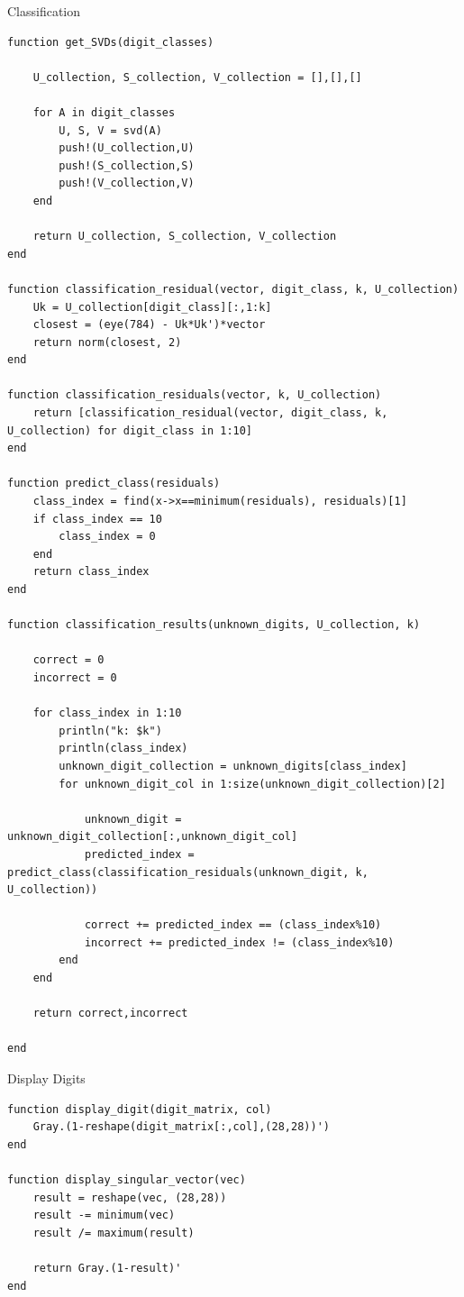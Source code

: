 \documentclass[a4paper]{article}
\begin{document}
\begin{algorithm}
\caption{Classification}

\begin{lstlisting}
function get_SVDs(digit_classes)

    U_collection, S_collection, V_collection = [],[],[]

    for A in digit_classes
        U, S, V = svd(A)
        push!(U_collection,U)
        push!(S_collection,S)
        push!(V_collection,V)
    end

    return U_collection, S_collection, V_collection
end

function classification_residual(vector, digit_class, k, U_collection)
    Uk = U_collection[digit_class][:,1:k]
    closest = (eye(784) - Uk*Uk')*vector
    return norm(closest, 2)
end

function classification_residuals(vector, k, U_collection)
    return [classification_residual(vector, digit_class, k, U_collection) for digit_class in 1:10]
end

function predict_class(residuals)
    class_index = find(x->x==minimum(residuals), residuals)[1]
    if class_index == 10
        class_index = 0
    end
    return class_index
end

function classification_results(unknown_digits, U_collection, k)
    
    correct = 0
    incorrect = 0

    for class_index in 1:10
        println("k: $k")
        println(class_index)
        unknown_digit_collection = unknown_digits[class_index]
        for unknown_digit_col in 1:size(unknown_digit_collection)[2]

            unknown_digit = unknown_digit_collection[:,unknown_digit_col]
            predicted_index = predict_class(classification_residuals(unknown_digit, k, U_collection))

            correct += predicted_index == (class_index%10)
            incorrect += predicted_index != (class_index%10)
        end
    end

    return correct,incorrect
    
end
\end{lstlisting}

\end{algorithm}


\begin{algorithm}
\caption{Display Digits}

\begin{lstlisting}
function display_digit(digit_matrix, col)
    Gray.(1-reshape(digit_matrix[:,col],(28,28))')
end

function display_singular_vector(vec)
    result = reshape(vec, (28,28))
    result -= minimum(vec)
    result /= maximum(result)

    return Gray.(1-result)'
end
\end{lstlisting}

\end{algorithm}



\end{document}
